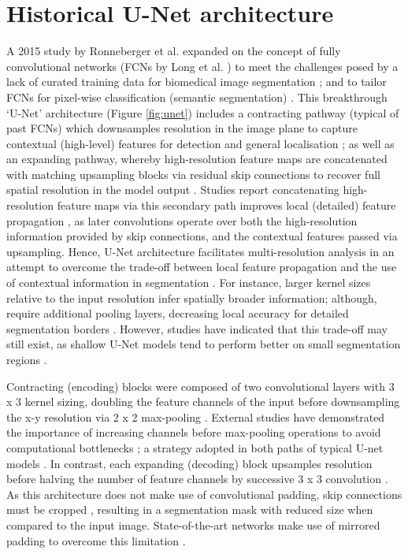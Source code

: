 \section{Historical U-Net architecture}
A 2015 study by Ronneberger et al. expanded on the concept of fully
convolutional networks (FCNs by Long et al. \cite{Long2014}) to meet the
challenges posed by a lack of curated training data for biomedical image
segmentation \cite{Ronneberger_2015}; and to tailor FCNs for pixel-wise
classification (semantic segmentation) \cite{DLINMI2018}. This breakthrough
`U-Net' architecture (Figure \ref{fig:unet}) includes a contracting pathway
(typical of past FCNs) which downsamples resolution in the image plane to
capture contextual (high-level) features for detection and general localisation
\cite{Nemoto_2020}; as well as an expanding pathway, whereby high-resolution
feature maps are concatenated with matching upsampling blocks via residual skip
connections \cite{Maier2019} to recover full spatial resolution in the model
output \cite{DLINMI2018}. Studies report concatenating high-resolution feature
maps via this secondary path improves local (detailed) feature propagation
\cite{Nemoto_2020}, as later convolutions operate over both the high-resolution
information provided by skip connections, and the contextual features passed via
upsampling. Hence, U-Net architecture facilitates multi-resolution analysis
\cite{Maier2019} in an attempt to overcome the trade-off between local feature
propagation and the use of contextual information in segmentation
\cite{Hesamian2019}. For instance, larger kernel sizes relative to the input
resolution infer spatially broader information; although, require additional
pooling layers, decreasing local accuracy for detailed segmentation borders
\cite{Hesamian2019}. However, studies have indicated that this trade-off may
still exist, as shallow U-Net models tend to perform better on small
segmentation regions \cite{Zhu_2018}.

Contracting (encoding) blocks were composed of two convolutional layers with 3 x
3 kernel sizing, doubling the feature channels of the input before downsampling
the x-y resolution via 2 x 2 max-pooling \cite{Ronneberger_2015}. External
studies have demonstrated the importance of increasing channels before
max-pooling operations to avoid computational bottlenecks \cite{szegedy2015}; a
strategy adopted in both paths of typical U-net models \cite{szegedy2015}. In
contrast, each expanding (decoding) block upsamples resolution before halving
the number of feature channels by successive 3 x 3 convolution
\cite{Ronneberger_2015}. As this architecture does not make use of convolutional
padding, skip connections must be cropped \cite{Ronneberger_2015}, resulting in
a segmentation mask with reduced size when compared to the input image.
State-of-the-art networks make use of mirrored padding to overcome this
limitation \cite{Nikolov_2018}.


